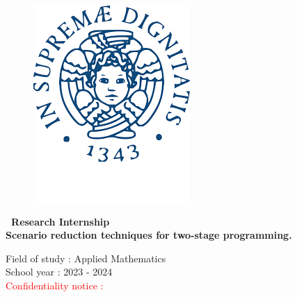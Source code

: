 \documentclass{amsart}
\begin{document}
\begin{figure}[htbp]
\begin{minipage}[b]{0.25\textwidth}
        \includegraphics[width=\textwidth]{logo/universita di pisa.png}
    \end{minipage}
\end{figure}

\vspace{1.5cm}	

\begin{center}	
    {\huge \bf\ Research Internship  \\
    \vspace{1cm}
    \huge Scenario reduction techniques for two-stage programming. \\
    \vspace{2cm}

    \large Field of study : Applied Mathematics \\
    \large School year : 2023 - 2024 \\



    \vspace{3.5cm}
    \large\textcolor{red}{Confidentiality notice : }\\
    \color{black}
    \vspace{0.5cm}
    }
\end{center}
\end{document}

